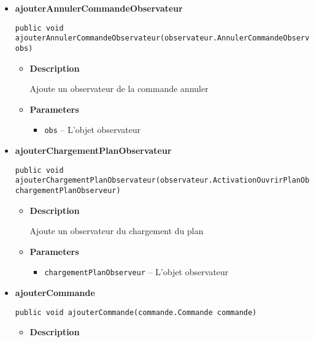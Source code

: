 \documentclass[11pt,a4paper]{report}
\begin{document}
{{{{{{\begin{itemize}
{\begin{itemize}
{Ajoute un observateur d'activation
}
\item{
{\bf  Parameters}
  \begin{itemize}
   \item{
\texttt{obs} -- L'objet observateur}
  \end{itemize}
}%
\end{itemize}
}%
\item{ 
\hypertarget{controleur.ControleurDonnees.ajouterAnnulerCommandeObservateur(controleur.observateur.AnnulerCommandeObservateur)}{{\bf  ajouterAnnulerCommandeObservateur}\\}
\begin{lstlisting}[frame=none]
public void ajouterAnnulerCommandeObservateur(observateur.AnnulerCommandeObservateur obs)\end{lstlisting} %
\begin{itemize}
\item{
{\bf  Description}

Ajoute un observateur de la commande annuler
}
\item{
{\bf  Parameters}
  \begin{itemize}
   \item{
\texttt{obs} -- L'objet observateur}
  \end{itemize}
}%
\end{itemize}
}%
\item{ 
\hypertarget{controleur.ControleurDonnees.ajouterChargementPlanObservateur(controleur.observateur.ActivationOuvrirPlanObservateur)}{{\bf  ajouterChargementPlanObservateur}\\}
\begin{lstlisting}[frame=none]
public void ajouterChargementPlanObservateur(observateur.ActivationOuvrirPlanObservateur chargementPlanObserveur)\end{lstlisting} %
\begin{itemize}
\item{
{\bf  Description}

Ajoute un observateur du chargement du plan
}
\item{
{\bf  Parameters}
  \begin{itemize}
   \item{
\texttt{chargementPlanObserveur} -- L'objet observateur}
  \end{itemize}
}%
\end{itemize}
}%
\item{ 
\hypertarget{controleur.ControleurDonnees.ajouterCommande(controleur.commande.Commande)}{{\bf  ajouterCommande}\\}
\begin{lstlisting}[frame=none]
public void ajouterCommande(commande.Commande commande)\end{lstlisting} %
\begin{itemize}
\item{
{\bf  Description}

}
\end{itemize}}
\end{itemize}}}}}}}
\end{document}
